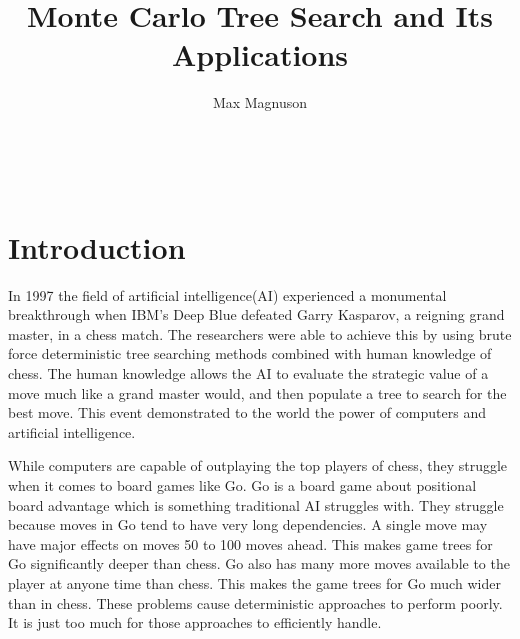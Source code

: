 \documentclass{sig-alternate}
\begin{document}

\title{Monte Carlo Tree Search and Its Applications}


\author{
\alignauthor
Max Magnuson\\
	\\
	\\
	\\
}

\maketitle
\begin{abstract}

\end{abstract}


\section{Introduction} 
In 1997 the field of artificial intelligence(AI) experienced a monumental breakthrough when IBM's Deep Blue defeated Garry Kasparov, a reigning grand master, in a chess match\cite{TheGrandChallenge}. The researchers were able to achieve this by using brute force deterministic tree searching methods combined with human knowledge of chess. The human knowledge allows the AI to evaluate the strategic value of a move much like a grand master would, and then populate a tree to search for the best move. This event demonstrated to the world the power of computers and artificial intelligence. 

While computers are capable of outplaying the top players of chess, they struggle when it comes to board games like Go\cite{TheGrandChallenge}. Go is a board game about positional board advantage which is something traditional AI struggles with. They struggle because moves in Go tend to have very long dependencies. A single move may have major effects on moves 50 to 100 moves ahead\cite{RAVEinGo}. This makes game trees for Go significantly deeper than chess. Go also has many more moves available to the player at anyone time than chess. This makes the game trees for Go much wider than in chess. These problems cause deterministic approaches to perform poorly. It is just too much for those approaches to efficiently handle.
\end{document}
